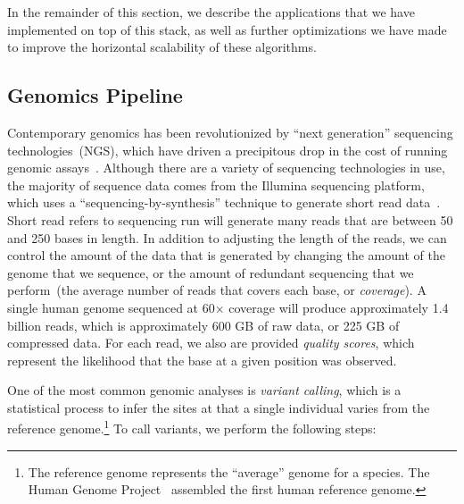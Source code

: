 \documentclass{acm_proc_article-sp}
\begin{document}
In the remainder of this section, we describe the applications that we have implemented on top of this
stack, as well as further optimizations we have made to improve the horizontal scalability of these
algorithms.

\subsection{Genomics Pipeline}
\label{sec:genomics-pipeline}

Contemporary genomics has been revolutionized by ``next generation'' sequencing
technologies~(NGS), which have \linebreak driven a precipitous drop in the cost of running genomic
assays~\cite{nhgri}. Although there are a variety of sequencing technologies in use, the majority of
sequence data comes from the Illumina sequencing platform, which uses a ``sequencing-by-synthesis''
technique to generate short read data~\cite{metzker09}. Short read refers to 
sequencing run will generate many reads that are between 50 and 250 bases in length. In addition to
adjusting the length of the reads, we can control the amount of the data that is generated by
changing the amount of the genome that we sequence, or the amount of redundant sequencing that
we perform~(the average number of reads that covers each base, or \emph{coverage}). A single
human genome sequenced at 60$\times$ coverage will produce approximately 1.4 billion reads,
which is approximately 600 GB of raw data, or 225 GB of compressed data. For each read, we also
are provided \emph{quality scores}, which represent the likelihood that the base at a given position
was observed.

One of the most common genomic analyses is \emph{variant calling}, which is a statistical process to
infer the sites at that a single individual varies from the reference genome.\footnote{The
reference genome represents the ``average'' genome for a species. The Human Genome
Project~\cite{lander01} assembled the first human reference genome.} To call variants, we perform the
following steps:
\end{document}
